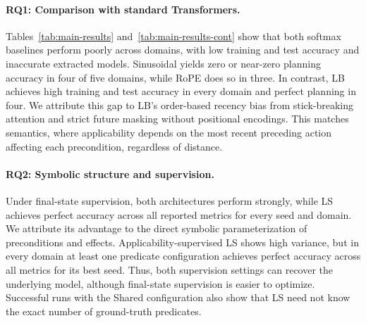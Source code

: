 







\paragraph{RQ1: Comparison with standard Transformers.}
Tables~\ref{tab:main-results} and~\ref{tab:main-results-cont} show that both softmax baselines perform poorly across domains, with low training and test accuracy and inaccurate extracted \strips models.
Sinusoidal yields zero or near-zero planning accuracy in four of five domains, while RoPE does so in three.
In contrast, LB achieves high training and test accuracy in every domain and perfect planning in four.
We attribute this gap to LB's order-based recency bias from stick-breaking attention and strict future masking without positional encodings.
This matches \strips semantics, where applicability depends on the most recent preceding action affecting each precondition, regardless of distance.

\paragraph{RQ2: Symbolic structure and supervision.}
Under final-state supervision, both architectures perform strongly, while LS achieves perfect accuracy across all reported metrics for every seed and domain.
We attribute its advantage to the direct symbolic parameterization of preconditions and effects.
Applicability-supervised LS shows high variance, but in every domain at least one predicate configuration achieves perfect accuracy across all metrics for its best seed.
Thus, both supervision settings can recover the underlying model, although final-state supervision is easier to optimize.
Successful runs with the Shared configuration also show that LS need not know the exact number of ground-truth predicates.

